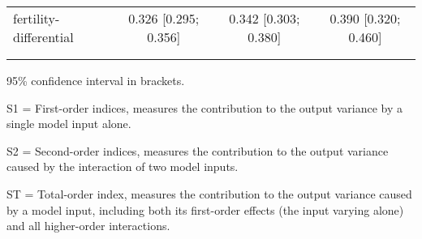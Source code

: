 \begin{table}[htp]
\begin{threeparttable}
\begin{tabular}{lccc}
	  \hspace{1.5em} fertility-differential & 0.326 [0.295; 0.356]   & 0.342 [0.303; 0.380]   & 0.390 [0.320; 0.460] \\
	 \\
    \addlinespace
    \hline
    \end{tabular}
    \begin{tablenotes}
    \scriptsize
    \item 95\% confidence interval in brackets.
    \item S1 = First-order indices,  measures the contribution to the output variance by a single model input alone.
    \item S2 = Second-order indices,  measures the contribution to the output variance caused by the interaction of two model inputs.
    \item ST = Total-order index, measures the contribution to the output variance caused by a model input, including both its first-order effects (the input varying alone) and all higher-order interactions.
    \end{tablenotes}
    \end{threeparttable}
    \end{table}